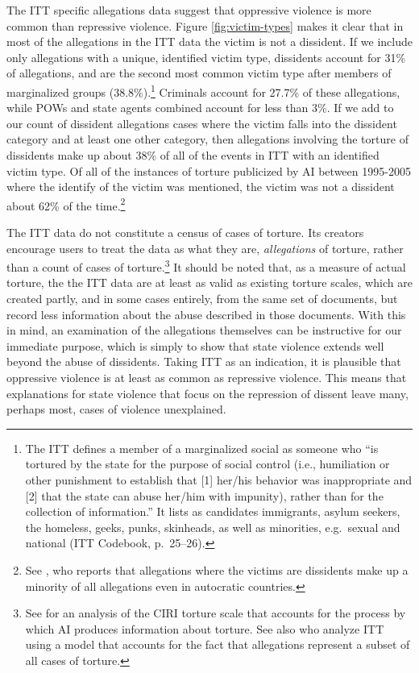 \documentclass[11pt]{article}
\begin{document}
The ITT specific allegations data suggest that oppressive violence is more common than repressive violence. Figure \ref{fig:victim-types} makes it clear that in most of the allegations in the ITT data the victim is not a dissident. If we include only allegations with a unique, identified victim type, dissidents account for 31\% of allegations, and are the second most common victim type after members of marginalized groups (38.8\%).\footnote{The ITT defines a member of a marginalized social as someone who ``is tortured by the state for the purpose of social control (i.e., humiliation or other punishment to establish that [1] her/his behavior was inappropriate and [2] that the state can abuse her/him with impunity), rather than for the collection of information.'' It lists as candidates immigrants, asylum seekers, the homeless, geeks, punks, skinheads, as well as minorities, e.g.\ sexual and national (ITT Codebook, p.\ 25--26).} Criminals account for 27.7\% of these allegations, while POWs and state agents combined account for less than 3\%. If we add to our count of dissident allegations cases where the victim falls into the dissident category and at least one other category, then allegations involving the torture of dissidents make up about 38\% of all of the events in ITT with an identified victim type. Of all of the instances of torture publicized by AI between 1995-2005 where the identify of the victim was mentioned, the victim was not a dissident about 62\% of the time.\footnote{See \citet[][pp.\ 3-4]{Haschke2018}, who reports that allegations where the victims are dissidents make up a minority of all allegations even in autocratic countries.} 

The ITT data do not constitute a census of cases of torture. Its creators encourage users to treat the data as what they are, {\em allegations} of torture, rather than a count of cases of torture.\footnote{See \citet{HillMooreMukherjee2013} for an analysis of the CIRI torture scale that accounts for the process by which AI produces information about torture. See also \citet{ConradHillMoore2018} who analyze ITT using a model that accounts for the fact that allegations represent a subset of all cases of torture.} It should be noted that, as a measure of actual torture, the the ITT data are at least as valid as existing torture scales, which are created partly, and in some cases entirely, from the same set of documents, but record less information about the abuse described in those documents. With this in mind, an examination of the allegations themselves can be instructive for our immediate purpose, which is simply to show that state violence extends well beyond the abuse of dissidents. Taking ITT as an indication, it is plausible that oppressive violence is at least as common as repressive violence. This means that explanations for state violence that focus on the repression of dissent leave many, perhaps most, cases of violence unexplained. 
\end{document}
